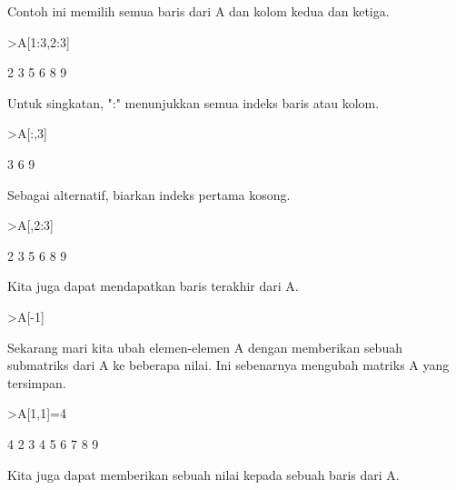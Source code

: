 \documentclass[a4paper,10pt]{article}
\begin{document}
\begin{eulernotebook}
\begin{eulercomment}
\begin{eulercomment}
\begin{eulercomment}
\begin{eulercomment}
\begin{eulercomment}
\begin{eulercomment}
\begin{eulercomment}
\begin{eulercomment}
\begin{eulercomment}
Contoh ini memilih semua baris dari A dan kolom kedua dan ketiga.
\end{eulercomment}
\begin{eulerprompt}
>A[1:3,2:3]
\end{eulerprompt}
\begin{euleroutput}
              2             3 
              5             6 
              8             9 
\end{euleroutput}
\begin{eulercomment}
Untuk singkatan, ":" menunjukkan semua indeks baris atau kolom.
\end{eulercomment}
\begin{eulerprompt}
>A[:,3]
\end{eulerprompt}
\begin{euleroutput}
              3 
              6 
              9 
\end{euleroutput}
\begin{eulercomment}
Sebagai alternatif, biarkan indeks pertama kosong.
\end{eulercomment}
\begin{eulerprompt}
>A[,2:3]
\end{eulerprompt}
\begin{euleroutput}
              2             3 
              5             6 
              8             9 
\end{euleroutput}
\begin{eulercomment}
Kita juga dapat mendapatkan baris terakhir dari A.
\end{eulercomment}
\begin{eulerprompt}
>A[-1]
\end{eulerprompt}
\begin{euleroutput}
  [7,  8,  9]
\end{euleroutput}
\begin{eulercomment}
Sekarang mari kita ubah elemen-elemen A dengan memberikan sebuah
submatriks dari A ke beberapa nilai. Ini sebenarnya mengubah matriks A
yang tersimpan.
\end{eulercomment}
\begin{eulerprompt}
>A[1,1]=4
\end{eulerprompt}
\begin{euleroutput}
              4             2             3 
              4             5             6 
              7             8             9 
\end{euleroutput}
\begin{eulercomment}
Kita juga dapat memberikan sebuah nilai kepada sebuah baris dari A.

\end{eulercomment}
\end{eulercomment}
\end{eulercomment}
\end{eulercomment}
\end{eulercomment}
\end{eulercomment}
\end{eulercomment}
\end{eulercomment}
\end{eulercomment}
\end{eulernotebook}
\end{document}

